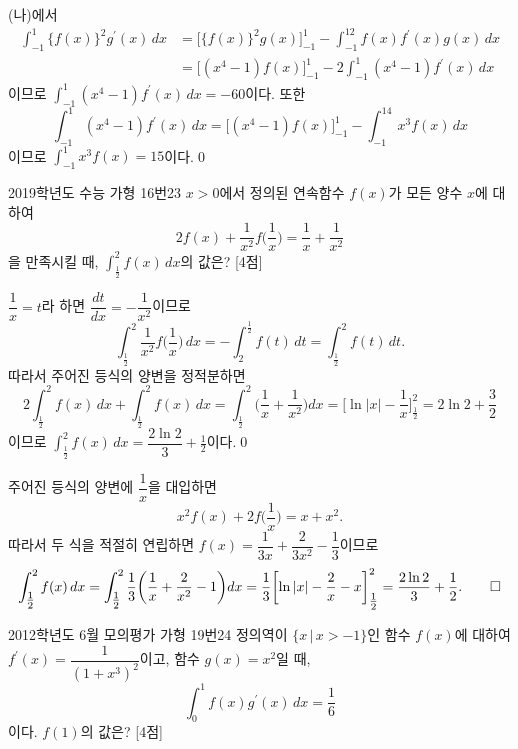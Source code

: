 \documentclass{article}
\begin{document}
\begin{sol}
	(나)에서
	\begin{align*}
		\int_{-1}^1\{f(x)\}^2g^{\prime}(x)\,dx&=\biggl[\{f(x)\}^2g(x)\biggr]_{-1}^1-\int_{-1}^12f(x)f^{\prime}(x)g(x)\,dx\\[3pt]
		&=\biggl[(x^4-1)f(x)\biggr]_{-1}^1-2\int_{-1}^1(x^4-1)f^{\prime}(x)\,dx
	\end{align*}
	이므로 $\displaystyle\int_{-1}^1(x^4-1)f^{\prime}(x)\,dx=-60$이다. 또한
	\[
		\int_{-1}^1(x^4-1)f^{\prime}(x)\,dx=\biggl[(x^4-1)f(x)\biggr]_{-1}^1-\int_{-1}^14x^3f(x)\,dx
	\]
	이므로 $\displaystyle\int_{-1}^1x^3f(x)=15$이다.\qed
\end{sol}

\newpage
\begin{prob}{2019학년도 수능 가형 16번}{23}
	$x>0$에서 정의된 연속함수 $f(x)$가 모든 양수 $x$에 대하여
	\[
		2f(x)+\frac{1}{x^2}f\biggl(\frac{1}{x}\biggr)=\frac{1}{x}+\frac{1}{x^2}
	\]
	을 만족시킬 때, $\displaystyle\int_{\tfrac{1}{2}}^2f(x)\,dx$의 값은? [4점]
\end{prob}

\begin{sol}[풀이 1]
	$\dfrac{1}{x}=t$라 하면 $\dfrac{dt}{dx}=-\dfrac{1}{x^2}$이므로
	\[
		\int_{\tfrac{1}{2}}^2\frac{1}{x^2}f\biggl(\frac{1}{x}\biggr)\,dx=-\int_2^{\tfrac{1}{2}}f(t)\,dt=\int_{\tfrac{1}{2}}^2f(t)\,dt.
	\]
	따라서 주어진 등식의 양변을 정적분하면
	\[
		2\int_{\tfrac{1}{2}}^2f(x)\,dx+\int_{\tfrac{1}{2}}^2f(x)\,dx=\int_{\tfrac{1}{2}}^2\biggl(\frac{1}{x}+\frac{1}{x^2}\biggr)dx=\biggl[\ln\vert x\vert-\frac{1}{x}\biggr]_{\tfrac{1}{2}}^2=2\ln 2+\frac{3}{2}
	\]
	이므로 $\displaystyle\int_{\tfrac{1}{2}}^2f(x)\,dx=\dfrac{2\ln 2}{3}+\frac{1}{2}$이다.\qed
\end{sol}	

\begin{sol}[풀이 2]
	주어진 등식의 양변에 $\dfrac{1}{x}$을 대입하면
	\[
		x^2f(x)+2f\bigg(\frac{1}{x}\biggr)=x+x^2.
	\]
	따라서 두 식을 적절히 연립하면 $f(x)=\dfrac{1}{3x}+\dfrac{2}{3x^2}-\dfrac{1}{3}$이므로
	\[
		\int_{\tfrac{1}{2}}^2f(x)\,dx=\int_{\tfrac{1}{2}}^2\frac{1}{3}\biggl(\frac{1}{x}+\frac{2}{x^2}-1\biggr)dx=\frac{1}{3}\biggl[\ln\vert x\vert-\frac{2}{x}-x\biggr]_{\tfrac{1}{2}}^2=\frac{2\ln 2}{3}+\frac{1}{2}.\qed
	\]
\end{sol}

\newpage
\begin{prob}{2012학년도 6월 모의평가 가형 19번}{24}
	정의역이 $\{x\,\vert\,x>-1\}$인 함수 $f(x)$에 대하여 $f^{\prime}(x)=\dfrac{1}{(1+x^3)^2}$이고, 함수 $g(x)=x^2$일 때,
	\[
		\int_0^1f(x)g^{\prime}(x)\,dx=\frac{1}{6}
	\]
	이다. $f(1)$의 값은? [4점]
\end{prob}
\end{document}

